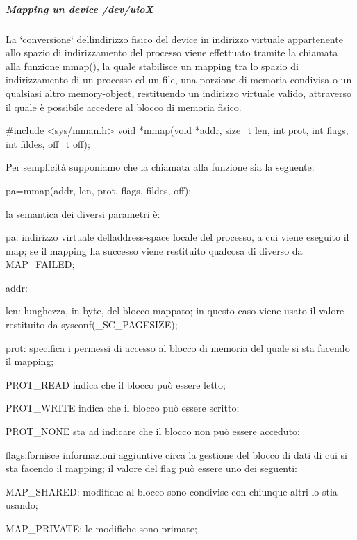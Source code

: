 \subparagraph*{Mapping un device /dev/uioX}

La \char`\"{}conversione\char`\"{} dell\textquotesingle{}indirizzo fisico del device in indirizzo virtuale appartenente allo spazio di indirizzamento del processo viene effettuato tramite la chiamata alla funzione mmap(), la quale stabilisce un mapping tra lo spazio di indirizzamento di un processo ed un file, una porzione di memoria condivisa o un qualsiasi altro memory-\/object, restituendo un indirizzo virtuale valido, attraverso il quale è possibile accedere al blocco di memoria fisico. 
\begin{DoxyCode}
\textcolor{preprocessor}{#include <sys/mman.h>}
\textcolor{keywordtype}{void} *mmap(\textcolor{keywordtype}{void} *addr, \textcolor{keywordtype}{size\_t} len, \textcolor{keywordtype}{int} prot, \textcolor{keywordtype}{int} flags, \textcolor{keywordtype}{int} fildes, off\_t off);
\end{DoxyCode}
 Per semplicità supponiamo che la chiamata alla funzione sia la seguente\+: \begin{center}pa=mmap(addr, len, prot, flags, fildes, off);\end{center}  la semantica dei diversi parametri è\+:
\begin{DoxyItemize}
\item pa\+: indirizzo virtuale dell\textquotesingle{}address-\/space locale del processo, a cui viene eseguito il map; se il mapping ha successo viene restituito qualcosa di diverso da M\+A\+P\+\_\+\+F\+A\+I\+L\+ED;
\item addr\+:
\item len\+: lunghezza, in byte, del blocco mappato; in questo caso viene usato il valore restituito da sysconf(\+\_\+\+S\+C\+\_\+\+P\+A\+G\+E\+S\+I\+Z\+E);
\item prot\+: specifica i permessi di accesso al blocco di memoria del quale si sta facendo il mapping;
\begin{DoxyItemize}
\item P\+R\+O\+T\+\_\+\+R\+E\+AD indica che il blocco può essere letto;
\item P\+R\+O\+T\+\_\+\+W\+R\+I\+TE indica che il blocco può essere scritto;
\item P\+R\+O\+T\+\_\+\+N\+O\+NE sta ad indicare che il blocco non può essere acceduto;
\end{DoxyItemize}
\item flags\+:fornisce informazioni aggiuntive circa la gestione del blocco di dati di cui si sta facendo il mapping; il valore del flag può essere uno dei seguenti\+:
\begin{DoxyItemize}
\item M\+A\+P\+\_\+\+S\+H\+A\+R\+ED\+: modifiche al blocco sono condivise con chiunque altri lo stia usando;
\item M\+A\+P\+\_\+\+P\+R\+I\+V\+A\+TE\+: le modifiche sono primate;
\end{DoxyItemize}
\end{DoxyItemize}
